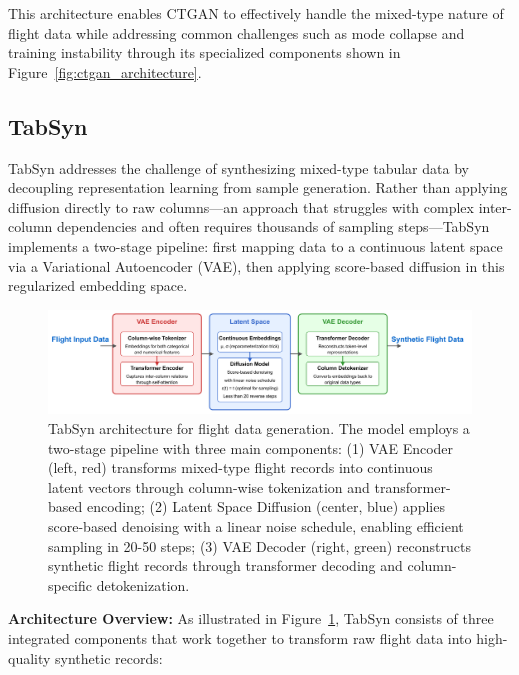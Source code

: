 \documentclass[conference]{IEEEtran}
\begin{document}
This architecture enables CTGAN to effectively handle the mixed-type nature of flight data while addressing common challenges such as mode collapse and training instability through its specialized components shown in Figure~\ref{fig:ctgan_architecture}.


\subsection{TabSyn}

TabSyn \cite{zhang2024mixed} addresses the challenge of synthesizing mixed-type tabular data by decoupling representation learning from sample generation. Rather than applying diffusion directly to raw columns—an approach that struggles with complex inter-column dependencies and often requires thousands of sampling steps—TabSyn implements a two-stage pipeline: first mapping data to a continuous latent space via a Variational Autoencoder (VAE), then applying score-based diffusion in this regularized embedding space.

\begin{figure}[htbp]
    \centering
    \includegraphics[width=\linewidth]{diagrams/tabsyn.pdf}
    \caption{TabSyn architecture for flight data generation. The model employs a two-stage pipeline with three main components: (1) VAE Encoder (left, red) transforms mixed-type flight records into continuous latent vectors through column-wise tokenization and transformer-based encoding; (2) Latent Space Diffusion (center, blue) applies score-based denoising with a linear noise schedule, enabling efficient sampling in 20-50 steps; (3) VAE Decoder (right, green) reconstructs synthetic flight records through transformer decoding and column-specific detokenization.}
    \label{fig:tabsyn_architecture}
\end{figure}

\textbf{Architecture Overview:} As illustrated in Figure~\ref{fig:tabsyn_architecture}, TabSyn consists of three integrated components that work together to transform raw flight data into high-quality synthetic records:
\end{document}
